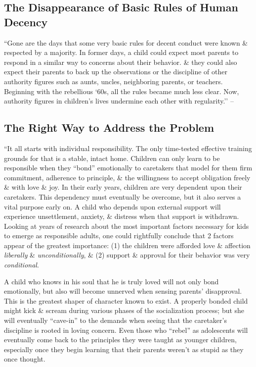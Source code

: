 \documentclass{article}
\numberwithin{equation}{section}
\begin{document}
\subsection{The Disappearance of Basic Rules of Human Decency}
``Gone are the days that some very basic rules for decent conduct were known \& respected by a majority. In former days, a child could expect most parents to respond in a similar way to concerns about their behavior. \& they could also expect their parents to back up the observations or the discipline of other authority figures such as aunts, uncles, neighboring parents, or teachers. Beginning with the rebellious `60s, all the rules became much less clear. Now, authority figures in children's lives undermine each other with regularity.'' -- \cite[p. 239]{Simon2011}

\subsection{The Right Way to Address the Problem}
``It all starts with individual responsibility. The only time-tested effective training grounds for that is a stable, intact home. Children can only learn to be responsible when they ``bond'' emotionally to caretakers that model for them firm commitment, adherence to principle, \& the willingness to accept obligation freely \& with love \& joy. In their early years, children are very dependent upon their caretakers. This dependency must eventually be overcome, but it also serves a vital purpose early on. A child who depends upon external support will experience unsettlement, anxiety, \& distress when that support is withdrawn. Looking at years of research about the most important factors necessary for kids to emerge as responsible adults, one could rightfully conclude that 2 factors appear of the greatest importance: (1) the children were afforded love \& affection \textit{liberally} \& \textit{unconditionally}, \& (2) support \& approval for their behavior was very \textit{conditional}.

A child who knows in his soul that he is truly loved will not only bond emotionally, but also will become unnerved when sensing parents' disapproval. This is the greatest shaper of character known to exist. A properly bonded child might kick \& scream during various phases of the socialization process; but she will eventually ``cave-in'' to the demands when seeing that the caretaker's discipline is rooted in loving concern. Even those who ``rebel'' as adolescents will eventually come back to the principles they were taught as younger children, especially once they begin learning that their parents weren't as stupid as they once thought.
\end{document}
